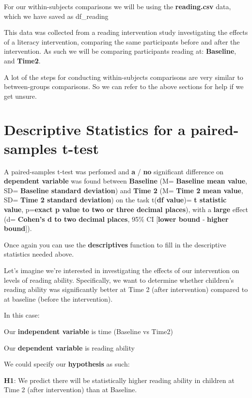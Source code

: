 \documentclass[
]{book}
\begin{document}
For our within-subjects comparisons we will be using the \textbf{reading.csv} data, which we have saved as df\_reading

This data was collected from a reading intervention study investigating the effects of a literacy intervention, comparing the same participants before and after the intervention. As such we will be comparing participants reading at: \textbf{Baseline}, and \textbf{Time2}.

A lot of the steps for conducting within-subjects comparisons are very similar to between-groups comparisons. So we can refer to the above sections for help if we get unsure.

\section{Descriptive Statistics for a paired-samples t-test}\label{descriptive-statistics-for-a-paired-samples-t-test}

A paired-samples t-test was perfomed and \textbf{a} / \textbf{no} significant difference on \textbf{dependent variable} was found between \textbf{Baseline} (M= \textbf{Baseline mean value}, SD= \textbf{Baseline standard deviation}) and \textbf{Time 2} (M= \textbf{Time 2 mean value}, SD= \textbf{Time 2 standard deviation}) on the task t(\textbf{df value})= \textbf{t statistic value}, p=\textbf{exact p value to two or three decimal places}), with a \textbf{large} effect (d= \textbf{Cohen's d to two decimal places}, 95\% CI {[}\textbf{lower bound} ‐ \textbf{higher bound}{]}).

Once again you can use the \textbf{descriptives} function to fill in the descriptive statistics needed above.

Let's imagine we're interested in investigating the effects of our intervention on levels of reading ability. Specifically, we want to determine whether children's reading ability was significantly better at Time 2 (after intervention) compared to at baseline (before the intervention).

In this case:

Our \textbf{independent variable} is time (Baseline vs Time2)

Our \textbf{dependent variable} is reading ability

We could specify our \textbf{hypothesis} as such:

\textbf{H1}: We predict there will be statistically higher reading ability in children at Time 2 (after intervention) than at Baseline.
\end{document}

